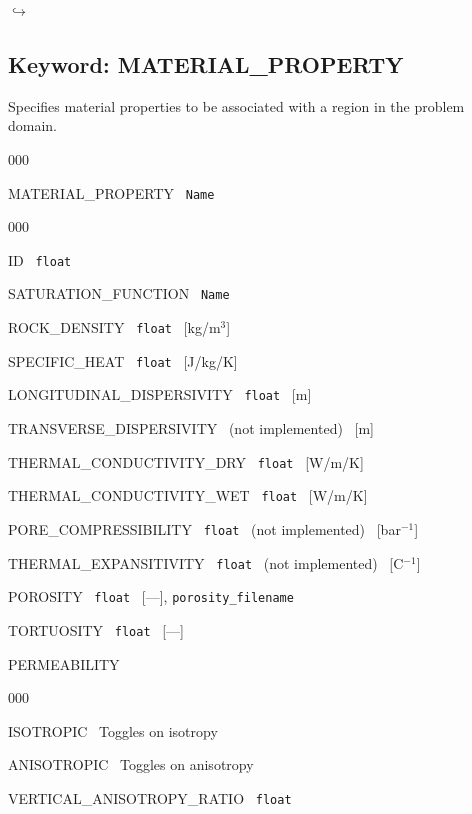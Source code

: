 \documentclass[12pt]{article}
\newcommand\return{{\hfill$\hookrightarrow$}}
\begin{document}


\hyperlink{target_key}{\return}


\newpage
\protect\hypertarget{target_mat}{}

\subsection{Keyword: MATERIAL\_PROPERTY}

 Specifies material properties to be associated with a region in the problem domain.

\begin{deflist}{000}
\item[MATERIAL\_PROPERTY] \ {\tt Name}
\begin{deflist}{000}
\item[ID] \ {\tt float}
\item[SATURATION\_FUNCTION] \ {\tt Name}
\item[ROCK\_DENSITY] \ {\tt float} \ [kg/m$^3$]
\item[SPECIFIC\_HEAT] \ {\tt float} \ [J/kg/K]
\item[LONGITUDINAL\_DISPERSIVITY] \ {\tt float} \ [m]
\item[TRANSVERSE\_DISPERSIVITY] \ (not implemented) \ [m]
\item[THERMAL\_CONDUCTIVITY\_DRY] \ {\tt float} \ [W/m/K]
\item[THERMAL\_CONDUCTIVITY\_WET] \ {\tt float} \ [W/m/K]
\item[PORE\_COMPRESSIBILITY] \ {\tt float} \ (not implemented) \ [bar$^{-1}$]
\item[THERMAL\_EXPANSITIVITY] \ {\tt float} \ (not implemented) \ [C$^{-1}$]
\item[POROSITY] \ {\tt float} \ [---], {\tt porosity\_filename}
\item[TORTUOSITY] \ {\tt float} \ [---]
\item[PERMEABILITY] ~
\begin{deflist}{000}
\item[ISOTROPIC] \ Toggles on isotropy
\item[ANISOTROPIC] \ Toggles on anisotropy
\item[VERTICAL\_ANISOTROPY\_RATIO] \ {\tt float}

\end{deflist}
\end{deflist}
\end{deflist}
\end{document}

